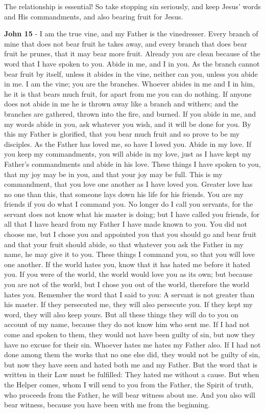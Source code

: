 \documentclass[11pt]{article}
\begin{document}
The relationship is essential!
So take stopping sin seriously, and keep Jesus' words and His commandments, and also bearing fruit for Jesus.

\textbf{John 15} - I am the true vine, and my Father is the vinedresser.  Every branch of mine that does not bear fruit he takes away, and every branch that does bear fruit he prunes, that it may bear more fruit.  Already you are clean because of the word that I have spoken to you.  Abide in me, and I in you. As the branch cannot bear fruit by itself, unless it abides in the vine, neither can you, unless you abide in me.  I am the vine; you are the branches. Whoever abides in me and I in him, he it is that bears much fruit, for apart from me you can do nothing.  If anyone does not abide in me he is thrown away like a branch and withers; and the branches are gathered, thrown into the fire, and burned.  If you abide in me, and my words abide in you, ask whatever you wish, and it will be done for you.  By this my Father is glorified, that you bear much fruit and so prove to be my disciples.  As the Father has loved me, so have I loved you. Abide in my love.  If you keep my commandments, you will abide in my love, just as I have kept my Father's commandments and abide in his love.  These things I have spoken to you, that my joy may be in you, and that your joy may be full.  This is my commandment, that you love one another as I have loved you.  Greater love has no one than this, that someone lays down his life for his friends.  You are my friends if you do what I command you.  No longer do I call you servants, for the servant does not know what his master is doing; but I have called you friends, for all that I have heard from my Father I have made known to you.  You did not choose me, but I chose you and appointed you that you should go and bear fruit and that your fruit should abide, so that whatever you ask the Father in my name, he may give it to you.  These things I command you, so that you will love one another.  If the world hates you, know that it has hated me before it hated you.  If you were of the world, the world would love you as its own; but because you are not of the world, but I chose you out of the world, therefore the world hates you.  Remember the word that I said to you: A servant is not greater than his master. If they persecuted me, they will also persecute you. If they kept my word, they will also keep yours.  But all these things they will do to you on account of my name, because they do not know him who sent me.  If I had not come and spoken to them, they would not have been guilty of sin, but now they have no excuse for their sin.  Whoever hates me hates my Father also.  If I had not done among them the works that no one else did, they would not be guilty of sin, but now they have seen and hated both me and my Father.  But the word that is written in their Law must be fulfilled: They hated me without a cause.  But when the Helper comes, whom I will send to you from the Father, the Spirit of truth, who proceeds from the Father, he will bear witness about me.  And you also will bear witness, because you have been with me from the beginning.
\end{document}
